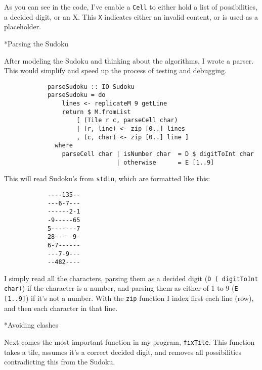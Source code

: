 \documentclass[a4paper,12pt]{article}
\begin{document}
\begin{section}
\begin{subsection}
\begin{subsubsection}
            As you can see in the code, I've enable a \texttt{Cell} to either hold a list of
            possibilities, a decided digit, or an X. This \texttt{X} indicates either an
            invalid content, or is used as a placeholder.

        \end{subsubsection}


        \begin{subsubsection}*{Parsing the Sudoku}

            After modeling the Sudoku and thinking about the algorithms, I wrote a parser.
            This would simplify and speed up the process of testing and debugging.

            \begin{lstlisting}
            parseSudoku :: IO Sudoku
            parseSudoku = do
                lines <- replicateM 9 getLine
                return $ M.fromList
                    [ (Tile r c, parseCell char)
                    | (r, line) <- zip [0..] lines
                    , (c, char) <- zip [0..] line ]
              where
                parseCell char | isNumber char  = D $ digitToInt char
                               | otherwise      = E [1..9]
            \end{lstlisting}

            This will read Sudoku's from \texttt{stdin}, which are formatted like this:

            \begin{verbatim}
            ----135--
            ---6-7---
            ------2-1
            -9-----65
            5-------7
            28-----9-
            6-7------
            ---7-9---
            --482----
            \end{verbatim}

            I simply read all the characters, parsing them as a decided digit (\texttt{D (
            digitToInt char)}) if the character is a number, and parsing them as either of 1
            to 9 (\texttt{E [1..9]}) if it's not a number. With the \texttt{zip} function I
            index first each line (row), and then each character in that line.

        \end{subsubsection}


        \begin{subsubsection}*{Avoiding clashes}

            Next comes the most important function in my program,
            \texttt{fixTile}. This function takes a tile, assumes it's a correct
            decided digit, and removes all possibilities contradicting this from
            the Sudoku.


\end{subsubsection}
\end{subsection}
\end{section}
\end{document}
